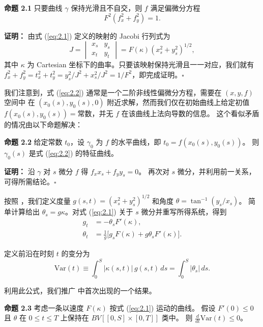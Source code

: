 \documentclass[11pt,a4paper]{article}
\begin{document}
\textbf{命题 2.1} \quad 只要曲线 $\gamma$ 保持光滑且不自交，则 $f$ 满足偏微分方程
\begin{equation}
F^2\left(f_x^2 + f_y^2\right) = 1.
\label{eq:2.2}
\end{equation}

\textbf{证明：} 由式 (\ref{eq:2.1}) 定义的映射的 Jacobi 行列式为
\begin{equation}
J = \begin{vmatrix} x_s & y_s \\ x_t & y_t \end{vmatrix}
= F(\kappa)(x_s^2 + y_s^2)^{1/2},
\end{equation}
其中 $\kappa$ 为 Cartesian 坐标下的曲率。只要该映射保持光滑且一一对应，我们就有
$f_x^2 + f_y^2 = t_x^2 + t_y^2 = y_s^2/J^2 + x_s^2/J^2 = 1/F^2$，即完成证明。\hfill $\square$

我们注意到，式 (\ref{eq:2.2}) 通常是一个二阶非线性偏微分方程，需要在 $(x,y,f)$ 空间中
在 $(x_0(s), y_0(s), 0)$ 附近求解，然而我们仅在初始曲线上给定初值
$f(x_0(s), y_0(s)) = \text{常数}$，并无 $f$ 在该曲线上法向导数的信息。
这个看似矛盾的情况由以下命题解决：

\textbf{命题 2.2} \quad 给定常数 $t_0$，设 $\gamma_0$ 为 $f$ 的水平曲线，即 $t_0 = f(x_0(s), y_0(s))$。
则 $\gamma_0(s)$ 是式 (\ref{eq:2.2}) 的特征曲线。

\textbf{证明：} 沿 $\gamma$ 对 $s$ 微分 $f$ 得 $f_x x_s + f_y y_s = 0$。
再次对 $s$ 微分，并利用前一关系，可得所需结论。\hfill $\square$

按照 \cite{sethian1985}，我们定义度量 $g(s,t) = (x_s^2 + y_s^2)^{1/2}$ 和角度 $\theta = \tan^{-1}(y_s/x_s)$。
简单计算给出 $\theta_s = g\kappa$。对式 (\ref{eq:2.1}) 关于 $s$ 微分并重写所得系统，得到
\begin{align}
g_t &= -\theta_s F'(\kappa), \label{eq:2.3} \\
\theta_t &= \frac{1}{g}\bigl[g_s F(\kappa) + g\theta_s F'(\kappa)\bigr]. \label{eq:2.4}
\end{align}

定义前沿在时刻 $t$ 的变分为
\begin{equation}
\text{Var}(t) \equiv \int_{0}^{S} |\kappa(s,t)|\,g(s,t)\,ds = \int_{0}^{S} |\theta_s|\,ds.
\end{equation}

利用此公式，我们推广 \cite{sethian1982} 中首次出现的一个结果。

\textbf{命题 2.3} \quad 考虑一条以速度 $F(\kappa)$ 按式 (\ref{eq:2.1}) 运动的曲线。
假设 $F'(0) \leq 0$ 且 $\theta$ 在 $0 \leq t \leq T$ 上保持在 $BV[[0,S]\times[0,T]]$ 类中。
则 $\frac{d}{dt}\text{Var}(t) \leq 0$。
\end{document}
